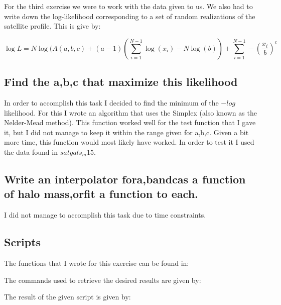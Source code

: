 \documentclass[a4paper,10pt]{article}
\begin{document}
For the third exercise we were to work with the data given to us. We also had to write down the log-likelihood corresponding to a set of random realizations of the satellite profile. This is give by:

\begin{equation}
\log L = N \log(A(a,b,c) + (a-1) (\sum\limits_{i=1}^{N-1} \log(x_i) - N \log(b)) + \sum\limits_{i=1}^{N-1} -(\frac{x_i}{b})^c
\end{equation}

\subsection{Find the a,b,c that maximize this likelihood}

In order to accomplish this task I decided to find the minimum of the $-log$ likelihood. For this I wrote an algorithm that uses the Simplex (also known as the Nelder-Mead method). This function worked well for the test function that I gave it, but I did not manage to keep it within the range given for a,b,c. Given a bit more time, this function would most likely have worked. In order to test it I used the data found in $satgals_m15$.
\subsection{Write an interpolator fora,bandcas a function of halo mass,orfit a function to each.}

I did not manage to accomplish this task due to time constraints. 

\subsection{Scripts}

The functions that I wrote for this exercise can be found in: 


The commands used to retrieve the desired results are given by:


The result of the given script is given by:

\end{document}
